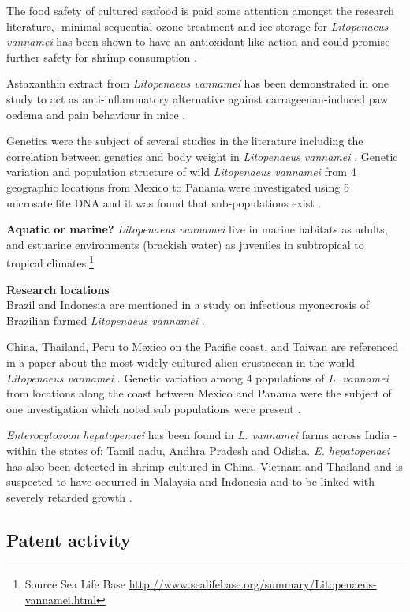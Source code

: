 \documentclass[openany]{book}
\let\rmarkdownfootnote\footnote%
\def\footnote{\protect\rmarkdownfootnote}
\theoremstyle{definition}
\theoremstyle{definition}
\theoremstyle{definition}
\theoremstyle{remark}
\begin{document}
The food safety of cultured seafood is paid some attention amongst the
research literature, -minimal sequential ozone treatment and ice storage
for \emph{Litopenaeus vannamei} has been shown to have an antioxidant
like action and could promise further safety for shrimp consumption
\citep{Okpala_2014}.

Astaxanthin extract from \emph{Litopenaeus vannamei} has been
demonstrated in one study to act as anti-inflammatory alternative
against carrageenan-induced paw oedema and pain behaviour in mice
\citep{Kuedo_2016}.

Genetics were the subject of several studies in the literature including
the correlation between genetics and body weight in \emph{Litopenaeus
vannamei} \citep{Glenn_2005}. Genetic variation and population structure
of wild \emph{Litopenaeus vannamei} from 4 geographic locations from
Mexico to Panama were investigated using 5 microsatellite DNA and it was
found that sub-populations exist \citep{Valles_Jimenez_2004}.

\textbf{Aquatic or marine?} \emph{Litopenaeus vannamei} live in marine
habitats as adults, and estuarine environments (brackish water) as
juveniles in subtropical to tropical climates.\footnote{Source Sea Life
  Base
  \url{http://www.sealifebase.org/summary/Litopenaeus-vannamei.html}}

\textbf{Research locations}\\
Brazil and Indonesia are mentioned in a study on infectious myonecrosis
of Brazilian farmed \emph{Litopenaeus vannamei} \citep{Silva_2010}.

China, Thailand, Peru to Mexico on the Pacific coast, and Taiwan are
referenced in a paper about the most widely cultured alien crustacean in
the world \emph{Litopenaeus vannamei} \citep{Liao_2011}. Genetic
variation among 4 populations of \emph{L. vannamei} from locations along
the coast between Mexico and Panama were the subject of one
investigation which noted sub populations were present
\citep{Valles_Jimenez_2004}.

\emph{Enterocytozoon hepatopenaei} has been found in \emph{L. vannamei}
farms across India - within the states of: Tamil nadu, Andhra Pradesh
and Odisha. \emph{E. hepatopenaei} has also been detected in shrimp
cultured in China, Vietnam and Thailand and is suspected to have
occurred in Malaysia and Indonesia and to be linked with severely
retarded growth \citep{Biju_2016}.

\hypertarget{patent-activity-2}{%
\subsection{Patent activity}\label{patent-activity-2}}
\end{document}
